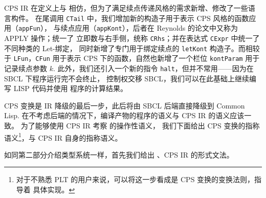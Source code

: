 \documentclass[a4paper, 11pt]{article}
\theoremstyle{remark}\newtheorem*{remark}{Remark}
\theoremstyle{definition}\newtheorem*{definition}{Definition}
\begin{document}
CPS IR 在定义上与 \Lambdair 相仿，但为了满足续点传递风格的需求新增、修改了一些语言构件。
在尾调用 \texttt{CTail} 中，我们增加新的构造子用于表示 CPS 风格的函数应用（\texttt{appFun}），
与续点应用（\texttt{appKont}），后者在 Reynolds 的论文中又称为 APPLY 操作；统一了
立即数与右手侧，统称 \texttt{CRhs}；并在表达式 \texttt{CExpr} 中统一了不同种类的 Let-绑定，
同时新增了专门用于绑定续点的 \texttt{letKont} 构造子。而相较于 \texttt{LFun}，\texttt{CFun}
用于表示 CPS 下的函数，自然也新增了一个栏位 \texttt{kontParam} 用于记录续点参数 $k$.
此外，我们还引入一个新的指令 \texttt{halt}，但并不常用——因为在 SBCL 下程序运行完不会终止，
控制权交移 SBCL，我们可以在此基础上继续编写 LISP 代码并使用 \Tigris 程序的计算结果。

CPS 变换是 IR 降级的最后一步，此后将由 SBCL 后端直接降级到 Common Lisp.
在不考虑后端的情况下，编译产物的程序的语义与 CPS IR 的语义应该一致。
为了能够使用 CPS IR 考察 \Tigris 的操作性语义，
我们下面给出 CPS 变换的指称语义\footnote{
  对于不熟悉 PLT 的用户来说，可以将这一步看成是 CPS 变换的变换法则，指导着
  具体实现。
}，与 CPS IR 自身的指称语义。

如同第二部分介绍类型系统一样，首先我们给出 \Lambdair、CPS IR 的形式文法。
\end{document}
